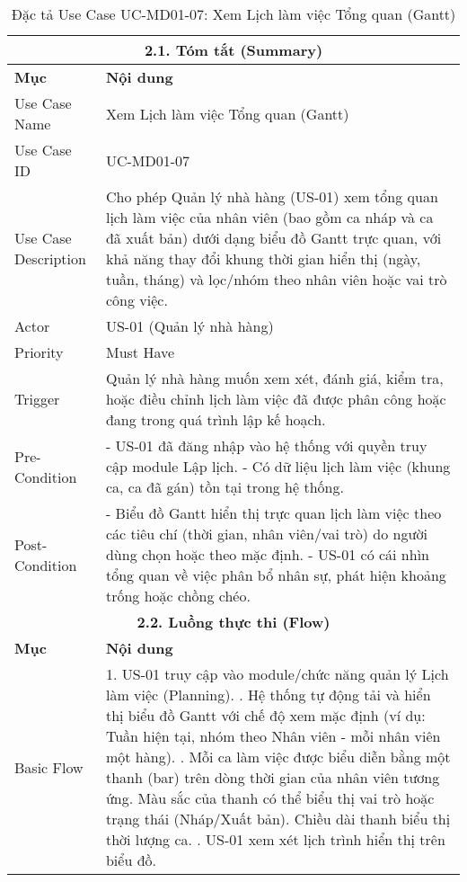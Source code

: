 \begin{longtable}{|m{4cm}|p{11cm}|}
\caption{Đặc tả Use Case UC-MD01-07: Xem Lịch làm việc Tổng quan (Gantt)} \label{tab:uc_md01_07_revised} \\
\hline
\multicolumn{2}{|c|}{\textbf{2.1. Tóm tắt (Summary)}} \\
\hline
\textbf{Mục} & \textbf{Nội dung} \\
\hline
\endhead %
\hline
\endfoot %
\hline
\endlastfoot %
Use Case Name & Xem Lịch làm việc Tổng quan (Gantt) \\
\hline
Use Case ID & UC-MD01-07 \\
\hline
Use Case Description & Cho phép Quản lý nhà hàng (US-01) xem tổng quan lịch làm việc của nhân viên (bao gồm ca nháp và ca đã xuất bản) dưới dạng biểu đồ Gantt trực quan, với khả năng thay đổi khung thời gian hiển thị (ngày, tuần, tháng) và lọc/nhóm theo nhân viên hoặc vai trò công việc. \\
\hline
Actor & US-01 (Quản lý nhà hàng) \\
\hline
Priority & Must Have \\
\hline
Trigger & Quản lý nhà hàng muốn xem xét, đánh giá, kiểm tra, hoặc điều chỉnh lịch làm việc đã được phân công hoặc đang trong quá trình lập kế hoạch. \\
\hline
Pre-Condition & - US-01 đã đăng nhập vào hệ thống với quyền truy cập module Lập lịch. \newline - Có dữ liệu lịch làm việc (khung ca, ca đã gán) tồn tại trong hệ thống. \\
\hline
Post-Condition & - Biểu đồ Gantt hiển thị trực quan lịch làm việc theo các tiêu chí (thời gian, nhân viên/vai trò) do người dùng chọn hoặc theo mặc định. \newline - US-01 có cái nhìn tổng quan về việc phân bổ nhân sự, phát hiện khoảng trống hoặc chồng chéo. \\
\hline
\multicolumn{2}{|c|}{\textbf{2.2. Luồng thực thi (Flow)}} \\
\hline
\textbf{Mục} & \textbf{Nội dung} \\
\hline
Basic Flow & 1. US-01 truy cập vào module/chức năng quản lý Lịch làm việc (Planning). \newline 2. Hệ thống tự động tải và hiển thị biểu đồ Gantt với chế độ xem mặc định (ví dụ: Tuần hiện tại, nhóm theo Nhân viên - mỗi nhân viên một hàng). \newline 3. Mỗi ca làm việc được biểu diễn bằng một thanh (bar) trên dòng thời gian của nhân viên tương ứng. Màu sắc của thanh có thể biểu thị vai trò hoặc trạng thái (Nháp/Xuất bản). Chiều dài thanh biểu thị thời lượng ca. \newline 4. US-01 xem xét lịch trình hiển thị trên biểu đồ. \\

\end{longtable}
